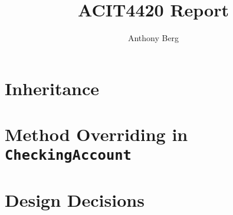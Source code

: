 \documentclass[11pt,british]{article}
\author{Anthony Berg}
\title{ACIT4420 Report}
\begin{document}
\maketitle

\section*{Inheritance}


\section*{Method Overriding in \Verb|CheckingAccount|}


\section*{Design Decisions}
\end{document}
